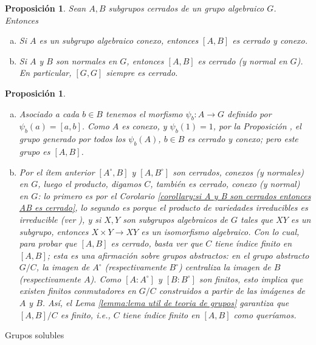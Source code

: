 \documentclass[spanish,10pt]{amsart}
\makeatletter
\renewcommand\subsection{\@startsection{subsection}{2}%
  \z@{.5\linespacing\@plus.7\linespacing}{-.5em}%
  {\normalfont\sffamily}}
\newtheorem{proposition}[theorem]{Proposición}
\theoremstyle{definition}
\theoremstyle{remark}
\numberwithin{equation}{section}
\makeatother
\begin{document}
\begin{proposition}\label{proposition: el conmutador de conexo es conexo}
Sean $A,B$ subgrupos cerrados de un grupo algebraico $G$. Entonces
\begin{enumerate}[(a)]
\item Si $A$ es un subgrupo algebraico conexo, entonces $[A,B]$ es cerrado y conexo.
\item Si $A$ y $B$ son normales en $G$, entonces $[A,B]$ es cerrado (y normal en $G$). En particular, $[G,G]$ siempre es cerrado.
\end{enumerate}
\end{proposition}
\begin{proposition}
\begin{enumerate}[(a)]
\item Asociado a cada $b \in B$ tenemos el morfismo $\psi_b : A \to G$ definido por $\psi_b (a) = [a,b]$. Como $A$ es conexo, y $\psi_b (1) = 1$, por la Proposición \cite[7.5]{humphreys2012linearAlgebraicGroups}, el grupo generado por todos los $\psi_b (A)$, $b \in B$ es cerrado y conexo; pero este grupo es $[A,B]$.
\item Por el ítem anterior $[A^\circ, B]$ y $[A, B^\circ]$ son cerrados, conexos (y normales) en $G$, luego el producto, digamos $C$, también es cerrado, conexo (y normal) en $G$: lo primero es por el Corolario \ref{corollary:si A y B son cerrados entonces AB es cerrado}, lo segundo es porque el producto de variedades irreducibles es irreducible (ver \cite[Proposición 2.8.5]{notas_pedro}), y si $X,Y$ son subgrupos algebraicos de $G$ tales que $XY$ es un subgrupo, entonces $X \times Y \to XY$ es un isomorfismo algebraico. Con lo cual, para probar que $[A,B]$ es cerrado, basta ver que $C$ tiene índice finito en $[A,B]$; esta es una afirmación sobre grupos abstractos: en el grupo abstracto $G/C$, la imagen de $A^\circ$ (respectivamente $B^\circ$) centraliza la imagen de $B$ (respectivamente $A$). Como $[A : A^\circ]$ y $[B: B^\circ]$ son finitos, esto implica que existen finitos conmutadores en $G/C$ construidos a partir de las imágenes de $A$ y $B$. Así, el Lema \ref{lemma:lema util de teoria de grupos} garantiza que $[A,B]/C$ es finito, i.e., $C$ tiene índice finito en $[A,B]$ como queríamos.
\end{enumerate}
\end{proposition}


\subsection{Grupos solubles}
\end{document}
